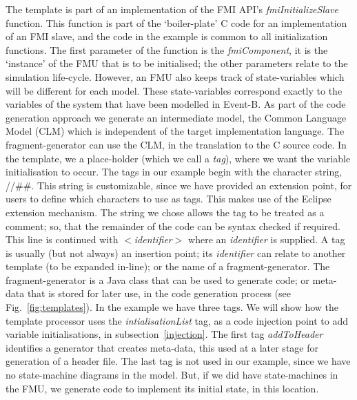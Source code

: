 \documentclass{llncs}%
\begin{document}
The template is part of an implementation of the FMI API's \emph{fmiInitializeSlave} function. This function is part of the `boiler-plate' C code for an implementation of an FMI slave, and the code in the example is common to all initialization functions. The first parameter of the function is the \emph{fmiComponent}, it is the `instance' of the FMU that is to be initialised; the other parameters relate to the simulation life-cycle.  However, an FMU also keeps track of state-variables which will be different for each model. These state-variables correspond exactly to the variables of the system that have been modelled in Event-B. As part of the code generation approach we generate an intermediate model, the Common Language Model (CLM) which is independent of the target implementation language. The fragment-generator can use the CLM, in the translation to the C source code.  In the template, we a place-holder (which we call a \emph{tag}), where we want the variable initialisation to occur. The tags in our example begin with the character string, //\#\#.  This string is customizable, since we have provided an extension point, for users to define which characters to use as tags. This makes use of the Eclipse extension mechanism. The string we chose allows the tag to be treated as a comment; so, that the remainder of the code can be syntax checked if required. This line is continued with $<$\emph{identifier}$>$ where an \emph{identifier} is supplied. A tag is usually (but not always) an insertion point; its \emph{identifier} can relate to another template (to be expanded in-line); or the name of a fragment-generator. The fragment-generator is a Java class that can be used to generate code; or meta-data that is stored for later use, in the code generation process  (see Fig.~\ref{fig:templates}). In the example we have three tags. We will show how the template processor uses the \emph{intialisationList} tag, as a code injection point to add variable initialisations, in subsection~\ref{injection}. The first tag \emph{addToHeader} identifies a generator that creates meta-data, this used at a later stage for generation of a header file. The last tag is not used in our example, since we have no state-machine diagrams in the model. But, if we did have state-machines in the FMU, we generate code to implement its initial state, in this location.
%
\end{document}
